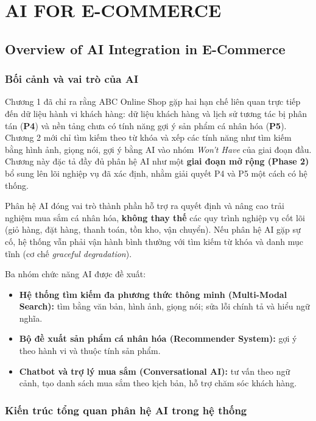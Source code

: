 \documentclass[12pt,a4paper,oneside]{report}
\begin{document}
\chapter{AI FOR E-COMMERCE}

\section{Overview of AI Integration in E-Commerce}

\subsection{Bối cảnh và vai trò của AI}

Chương 1 đã chỉ ra rằng ABC Online Shop gặp hai hạn chế liên quan trực tiếp đến dữ liệu hành vi khách hàng: dữ liệu khách hàng và lịch sử tương tác bị phân tán (\textbf{P4}) và nền tảng chưa có tính năng gợi ý sản phẩm cá nhân hóa (\textbf{P5}). Chương 2 mới chỉ tìm kiếm theo từ khóa và xếp các tính năng như tìm kiếm bằng hình ảnh, giọng nói, gợi ý bằng AI vào nhóm \emph{Won't Have} của giai đoạn đầu. Chương này đặc tả đầy đủ phân hệ AI như một \textbf{giai đoạn mở rộng (Phase 2)} bổ sung lên lõi nghiệp vụ đã xác định, nhằm giải quyết P4 và P5 một cách có hệ thống.

Phân hệ AI đóng vai trò thành phần hỗ trợ ra quyết định và nâng cao trải nghiệm mua sắm cá nhân hóa, \textbf{không thay thế} các quy trình nghiệp vụ cốt lõi (giỏ hàng, đặt hàng, thanh toán, tồn kho, vận chuyển). Nếu phân hệ AI gặp sự cố, hệ thống vẫn phải vận hành bình thường với tìm kiếm từ khóa và danh mục tĩnh (cơ chế \emph{graceful degradation}).

Ba nhóm chức năng AI được đề xuất:

\begin{itemize}
  \item \textbf{Hệ thống tìm kiếm đa phương thức thông minh (Multi-Modal Search):} tìm bằng văn bản, hình ảnh, giọng nói; sửa lỗi chính tả và hiểu ngữ nghĩa.
  \item \textbf{Bộ đề xuất sản phẩm cá nhân hóa (Recommender System):} gợi ý theo hành vi và thuộc tính sản phẩm.
  \item \textbf{Chatbot và trợ lý mua sắm (Conversational AI):} tư vấn theo ngữ cảnh, tạo danh sách mua sắm theo kịch bản, hỗ trợ chăm sóc khách hàng.
\end{itemize}

\subsection{Kiến trúc tổng quan phân hệ AI trong hệ thống}
\end{document}
